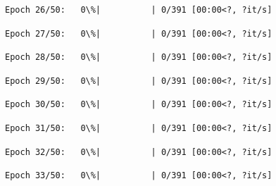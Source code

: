 \documentclass[11pt]{article}
\begin{document}
    
    
    \begin{Verbatim}[commandchars=\\\{\}]
Epoch 26/50:   0\%|          | 0/391 [00:00<?, ?it/s]
    \end{Verbatim}

    
    
    \begin{Verbatim}[commandchars=\\\{\}]
Epoch 27/50:   0\%|          | 0/391 [00:00<?, ?it/s]
    \end{Verbatim}

    
    
    \begin{Verbatim}[commandchars=\\\{\}]
Epoch 28/50:   0\%|          | 0/391 [00:00<?, ?it/s]
    \end{Verbatim}

    
    
    \begin{Verbatim}[commandchars=\\\{\}]
Epoch 29/50:   0\%|          | 0/391 [00:00<?, ?it/s]
    \end{Verbatim}

    
    
    \begin{Verbatim}[commandchars=\\\{\}]
Epoch 30/50:   0\%|          | 0/391 [00:00<?, ?it/s]
    \end{Verbatim}

    
    
    \begin{Verbatim}[commandchars=\\\{\}]
Epoch 31/50:   0\%|          | 0/391 [00:00<?, ?it/s]
    \end{Verbatim}

    
    
    \begin{Verbatim}[commandchars=\\\{\}]
Epoch 32/50:   0\%|          | 0/391 [00:00<?, ?it/s]
    \end{Verbatim}

    
    
    \begin{Verbatim}[commandchars=\\\{\}]
Epoch 33/50:   0\%|          | 0/391 [00:00<?, ?it/s]
    \end{Verbatim}
\end{document}
